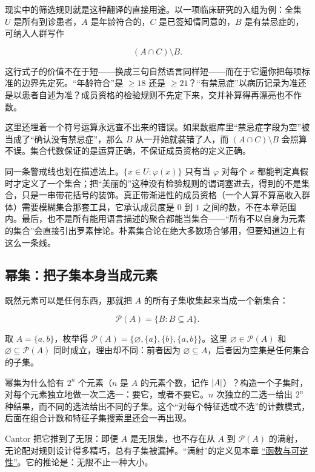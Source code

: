现实中的筛选规则就是这种翻译的直接用途。以一项临床研究的入组为例：全集 \(U\) 是所有到诊患者，\(A\) 是年龄符合的，\(C\) 是已签知情同意的，\(B\) 是有禁忌症的，可纳入人群写作

\[
(A\cap C)\setminus B.
\]

这行式子的价值不在于短——换成三句自然语言同样短——而在于它逼你把每项标准的边界先定死。``年龄符合''是 \(\ge 18\) 还是 \(\ge 21\)？``有禁忌症''以病历记录为准还是以患者自述为准？成员资格的检验规则不先定下来，交并补算得再漂亮也不作数。

这里还埋着一个符号运算永远查不出来的错误。如果数据库里``禁忌症字段为空''被当成了``确认没有禁忌症''，那么 \(B\) 从一开始就装错了人，而 \((A\cap C)\setminus B\) 会照算不误。集合代数保证的是运算正确，不保证成员资格的定义正确。

同一条警戒线也划在描述法上。\(\{x\in U:\varphi(x)\}\) 只有当 \(\varphi\) 对每个 \(x\) 都能判定真假时才定义了一个集合；把``美丽的''这种没有检验规则的谓词塞进去，得到的不是集合，只是一串带花括号的装饰。真正带渐进性的成员资格（一个人算不算高收入群体）需要模糊集合那套工具，它承认成员度是 \(0\) 到 \(1\) 之间的数，不在本章范围内。最后，也不是所有能用语言描述的聚合都能当集合——``所有不以自身为元素的集合''会直接引出罗素悖论。朴素集合论在绝大多数场合够用，但要知道边上有这么一条线。

\subsection{幂集：把子集本身当成元素}

既然元素可以是任何东西，那就把 \(A\) 的所有子集收集起来当成一个新集合：

\[
\mathcal P(A)=\{B:B\subseteq A\}.
\]

取 \(A=\{a,b\}\)，枚举得 \(\mathcal P(A)=\{\varnothing,\{a\},\{b\},\{a,b\}\}\)。这里 \(\varnothing\in\mathcal P(A)\) 和 \(\varnothing\subseteq\mathcal P(A)\) 同时成立，理由却不同：前者因为 \(\varnothing\subseteq A\)，后者因为空集是任何集合的子集。

幂集为什么恰有 \(2^{n}\) 个元素（\(n\) 是 \(A\) 的元素个数，记作 \(\left|A\right|\)）？构造一个子集时，对每个元素独立地做一次二选一：要它，或者不要它。\(n\) 次独立的二选一给出 \(2^{n}\) 种结果，而不同的选法给出不同的子集。这个``对每个特征选或不选''的计数模式，后面在组合计数和特征子集搜索里还会一再出现。

Cantor 把它推到了无限：即便 \(A\) 是无限集，也不存在从 \(A\) 到 \(\mathcal P(A)\) 的满射，无论配对规则设计得多精巧，总有子集被漏掉。``满射''的定义见本章 \hyperref[sec:01-Mathematical-Language/02-Sets-Relations-Functions/04]{``函数与可逆性''}。它的推论是：无限不止一种大小。


